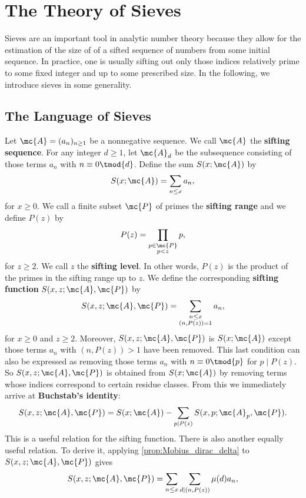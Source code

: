 \chapter{The Theory of Sieves}
  Sieves are an important tool in analytic number theory because they allow for the estimation of the size of of a sifted sequence of numbers from some initial sequence. In practice, one is usually sifting out only those indices relatively prime to some fixed integer and up to some prescribed size. In the following, we introduce sieves in some generality.
  \section{The Language of Sieves}
    Let $\mc{A} = (a_{n})_{n \ge 1}$ be a nonnegative sequence. We call $\mc{A}$ the \textbf{sifting sequence}. For any integer $d \ge 1$, let $\mc{A}_{d}$ be the subsequence consisting of those terms $a_{n}$ with $n \equiv 0 \tmod{d}$. Define the sum $S(x;\mc{A})$ by
    \[
      S(x;\mc{A}) = \sum_{\substack{n \le x}}a_{n},
    \]
    for $x \ge 0$. We call a finite subset $\mc{P}$ of primes the \textbf{sifting range} and we define $P(z)$ by
    \[
      P(z) = \prod_{\substack{p \in \mc{P} \\ p < z}}p,
    \]
    for $z \ge 2$. We call $z$ the \textbf{sifting level}. In other words, $P(z)$ is the product of the primes in the sifting range up to $z$. We define the corresponding \textbf{sifting function} $S(x,z;\mc{A},\mc{P})$ by
    \[
      S(x,z;\mc{A},\mc{P}) = \sum_{\substack{n \le x \\ (n,P(z)) = 1}}a_{n},
    \]
    for $x \ge 0$ and $z \ge 2$. Moreover, $S(x,z;\mc{A},\mc{P})$ is $S(x;\mc{A})$ except those terms $a_{n}$ with $(n,P(z)) > 1$ have been removed. This last condition can also be expressed as removing those terms $a_{n}$ with $n \equiv 0 \tmod{p}$ for $p \mid P(z)$. So $S(x,z;\mc{A},\mc{P})$ is obtained from $S(x;\mc{A})$ by removing terms whose indices correspond to certain residue classes. From this we immediately arrive at \textbf{Buchstab's identity}:
    \[
      S(x,z;\mc{A},\mc{P}) = S(x;\mc{A})-\sum_{p \mid P(z)}S(x,p;\mc{A}_{p},\mc{P}).
    \]
    This is a useful relation for the sifting function. There is also another equally useful relation. To derive it, applying \cref{prop:Mobius_dirac_delta} to $S(x,z;\mc{A},\mc{P})$ gives
    \[
      S(x,z;\mc{A},\mc{P}) = \sum_{n \le x}\sum_{d \mid (n,P(z))}\mu(d)a_{n},
    \]
